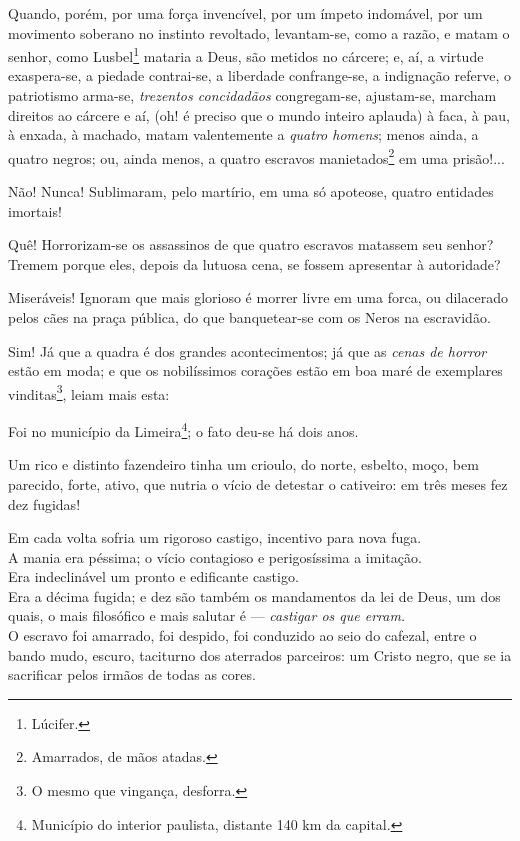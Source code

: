 Quando, porém, por uma força invencível, por um ímpeto indomável, por um
movimento soberano no instinto revoltado, levantam-se, como a razão, e
matam o senhor, como Lusbel\footnote{Lúcifer.} mataria a Deus, são
metidos no cárcere; e, aí, a virtude exaspera-se, a piedade contrai-se,
a liberdade confrange-se, a indignação referve, o patriotismo arma-se,
\emph{trezentos concidadãos} congregam-se, ajustam-se, marcham direitos
ao cárcere e aí, (oh! é preciso que o mundo inteiro aplauda) à faca, à
pau, à enxada, à machado, matam valentemente a \emph{quatro homens};
menos ainda, a quatro negros; ou, ainda menos, a quatro escravos
manietados\footnote{Amarrados, de mãos atadas.} em uma prisão!...

Não! Nunca! Sublimaram, pelo martírio, em uma só apoteose, quatro
entidades imortais!

Quê! Horrorizam-se os assassinos de que quatro escravos matassem seu
senhor? Tremem porque eles, depois da lutuosa cena, se fossem apresentar
à autoridade?

Miseráveis! Ignoram que mais glorioso é morrer livre em uma forca, ou
dilacerado pelos cães na praça pública, do que banquetear-se com os
Neros na escravidão.

Sim! Já que a quadra é dos grandes acontecimentos; já que as \emph{cenas
de horror} estão em moda; e que os nobilíssimos corações estão em boa
maré de exemplares vinditas\footnote{O mesmo que vingança, desforra.},
leiam mais esta:

Foi no município da Limeira\footnote{Município do interior paulista,
  distante 140 km da capital.}; o fato deu-se há dois anos.

Um rico e distinto fazendeiro tinha um crioulo, do norte, esbelto, moço,
bem parecido, forte, ativo, que nutria o vício de detestar o cativeiro:
em três meses fez dez fugidas!

Em cada volta sofria um rigoroso castigo, incentivo para nova fuga.\\
A mania era péssima; o vício contagioso e perigosíssima a imitação.\\
Era indeclinável um pronto e edificante castigo.\\
Era a décima fugida; e dez são também os mandamentos da lei de Deus, um
dos quais, o mais filosófico e mais salutar é --- \emph{castigar os que
erram.\\
} O escravo foi amarrado, foi despido, foi conduzido ao seio do cafezal,
entre o bando mudo, escuro, taciturno dos aterrados parceiros: um Cristo
negro, que se ia sacrificar pelos irmãos de todas as cores.

